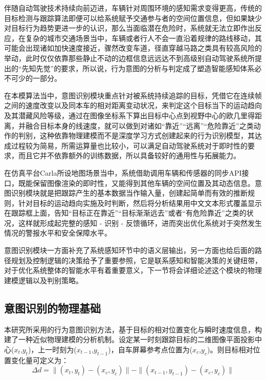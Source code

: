 伴随自动驾驶技术持续向前迈进，车辆针对周围环境的感知需求变得更高，传统的目标检测与跟踪算法即便可以给系统赋予交通参与者的空间位置信息，但如果缺少对目标行为趋势更进一步的认识，那么当面临潜在危险时，系统就无法立即作出反应，在复杂的城市交通场景当中，车辆或者行人不会一直沿着规律的路线移动，其可能会出现诸如加快速度接近，骤然改变车道，径直穿越马路之类具有较高风险的举动，此时仅仅依靠那些静止不动的边框信息远远达不到高级别自动驾驶系统所提出的“先知先觉”的要求，所以说，行为意图的分析与判定成了塑造智能感知体系必不可少的一部分。

在本模算法当中，意图识别模块重点针对被系统持续追踪的目标，凭借它在连续帧之间的速度改变以及同本车的相对距离变动状况，来判定这个目标当下的运动趋向及其潜藏风险等级，通过在图像坐标系下算出目标中心点到视野中心的欧几里得距离，并融合目标本身的线速度，就可以做到对诸如“靠近”“远离”“危险靠近”之类动作的判别，这种依靠物理建模而不是深度学习方式创建起来的行为识别模型，其达成过程较为简易，所需运算量也比较小，可以满足自动驾驶系统对于即时性的要求，而且它并不依靠额外的训练数据，所以具备较好的通用性与拓展能力。

在仿真平台Carla所设地图场景当中，系统借助调用车辆和传感器的同步API接口，既能保留图像渲染的即时性，又能得到其他车辆的空间位置及其动态信息。意图识别模块就是把跟踪产生的基本数据当作输入量，创建起简单而有效的推断规则，针对目标的运动趋向实施及时判断，然后将分析结果用中文文本形式覆盖显示在跟踪框上面，告知“目标正在靠近”“目标渐渐远去”或者“有危险靠近”之类的状况，这样就形成起完整的感知 - 识别 - 反馈循环，进而突出优化系统对于突然发生情况的警报水平和安全保障水平。

意图识别模块一方面补充了系统感知环节中的语义层输出，另一方面也给后面的路径规划及控制逻辑的决策给予了重要参照，它是联系感知和智能决策的关键纽带，对于优化系统整体的智能水平有着重要意义，下一节将会详细论述这个模块的物理建模逻辑以及判别策略。

\subsection{意图识别的物理基础}

本研究所采用的行为意图识别方法，基于目标的相对位置变化与瞬时速度信息，构建了一种近似物理建模的分析机制。设定某一时刻跟踪目标的二维图像平面投影中心($x_t$,$y_t$)，上一时刻为($x_{t-1}$,$y_{t-1}$)，自车屏幕参考点位置为($x_c$,$y_c$)。则目标相对位置变化量可定义为：
\begin{equation}
	\Delta d = \|(x_t, y_t) - (x_c, y_c)\| - \|(x_{t - 1}, y_{t - 1}) - (x_c, y_c)\|
\end{equation}

